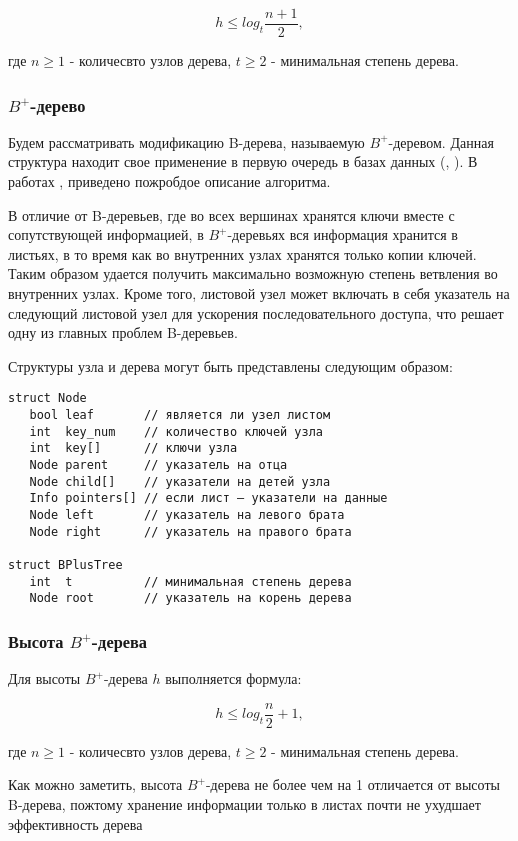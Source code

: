 \documentclass[14pt, russian]{scrartcl}
\begin{document}
$$h \le log_t \frac{n + 1}{2},$$

где $n \ge 1$ - количесвто узлов дерева, $t \ge 2$ - минимальная степень дерева.

\subsubsection{$B^+$-дерево}
Будем рассматривать модификацию B-дерева, называемую \textbf{$B^+$}-деревом. Данная структура находит свое применение в первую очередь в базах данных (\cite{petrov}, \cite{silberschatz}). В работах \cite{btrees}, \cite{scylladb} приведено пожробдое описание алгоритма.

В отличие от B-деревьев, где  во всех вершинах хранятся ключи вместе с сопутствующей информацией, в $B^+$-деревьях вся информация хранится в листьях, в то время как во внутренних узлах хранятся только копии ключей. Таким образом удается получить максимально возможную степень ветвления во внутренних узлах. Кроме того, листовой узел может включать в себя указатель на следующий листовой узел для ускорения последовательного доступа, что решает одну из главных проблем B-деревьев.

Структуры узла и дерева могут быть представлены следующим образом:
\begin{verbatim}
struct Node
   bool leaf       // является ли узел листом
   int  key_num    // количество ключей узла
   int  key[]      // ключи узла
   Node parent     // указатель на отца
   Node child[]    // указатели на детей узла
   Info pointers[] // если лист — указатели на данные
   Node left       // указатель на левого брата
   Node right      // указатель на правого брата

struct BPlusTree
   int  t          // минимальная степень дерева
   Node root       // указатель на корень дерева
\end{verbatim}

\subsubsection{Высота $B^+$-дерева}
Для высоты  $B^+$-дерева $h$ выполняется формула:

$$h \le log_t \frac{n}{2} + 1,$$

где $n \ge 1$ - количесвто узлов дерева, $t \ge 2$ - минимальная степень дерева. 

Как можно заметить, высота $B^+$-дерева не более чем на 1 отличается от высоты B-дерева, пожтому хранение информации только в листах почти не ухудшает эффективность дерева 
\end{document}
